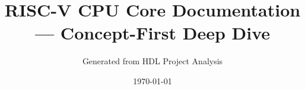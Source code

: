 \documentclass[12pt,a4paper]{article}
\title{RISC-V CPU Core Documentation — Concept-First Deep Dive}
\author{Generated from HDL Project Analysis}
\date{\today}
\begin{document}
\maketitle
\tableofcontents
\newpage




\FloatBarrier
\clearpage




\FloatBarrier
\clearpage




\FloatBarrier
\clearpage




\FloatBarrier
\clearpage




\FloatBarrier
\clearpage




\FloatBarrier
\clearpage




\FloatBarrier
\clearpage




\FloatBarrier
\clearpage




\FloatBarrier
\clearpage




\FloatBarrier
\clearpage




\FloatBarrier
\clearpage




\FloatBarrier
\clearpage




\FloatBarrier
\clearpage




\FloatBarrier
\clearpage




\FloatBarrier
\clearpage


\end{document}
